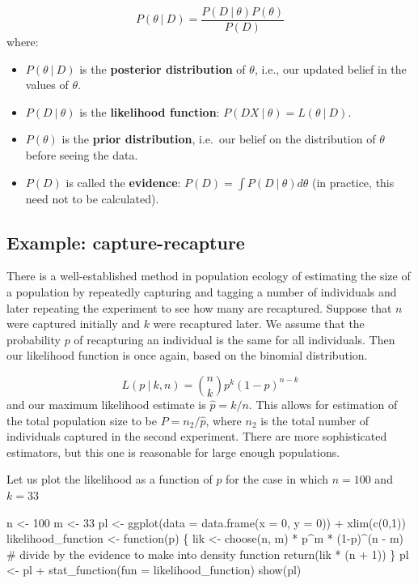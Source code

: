 \documentclass[
  letterpaper,
  DIV=11,
  numbers=noendperiod]{scrreprt}
\newenvironment{Shaded}{\begin{snugshade}}{\end{snugshade}}
\newcommand{\NormalTok}[1]{\textcolor[rgb]{0.00,0.23,0.31}{#1}}
\providecommand{\tightlist}{%
  \setlength{\itemsep}{0pt}\setlength{\parskip}{0pt}}\usepackage{longtable,booktabs,array}
\begin{document}
\[
P(\theta \ \vert \ D) = \frac{P(D \ \vert \ \theta) P(\theta)}{P(D)}
\] where:

\begin{itemize}
\tightlist
\item
  \(P(\theta \ \vert \ D)\) is the \textbf{posterior distribution} of
  \(\theta\), i.e., our updated belief in the values of \(\theta\).
\item
  \(P(D \ \vert \ \theta)\) is the \textbf{likelihood function}:
  \(P(DX \ \vert \ \theta) = L(\theta \ \vert \ D)\).
\item
  \(P(\theta)\) is the \textbf{prior distribution}, i.e.~our belief on
  the distribution of \(\theta\) before seeing the data.
\item
  \(P(D)\) is called the \textbf{evidence}:
  \(P(D) = \int P(D \ \vert \ \theta) d \theta\) (in practice, this need
  not to be calculated).
\end{itemize}

\subsection{Example: capture-recapture}\label{example-capture-recapture}

There is a well-established method in population ecology of estimating
the size of a population by repeatedly capturing and tagging a number of
individuals and later repeating the experiment to see how many are
recaptured. Suppose that \(n\) were captured initially and \(k\) were
recaptured later. We assume that the probability \(p\) of recapturing an
individual is the same for all individuals. Then our likelihood function
is once again, based on the binomial distribution.

\[
L(p \ \vert \ k, n) = \binom{n}{k}p^k (1-p)^{n-k}
\] and our maximum likelihood estimate is \(\hat{p} = k /n\). This
allows for estimation of the total population size to be
\(P = n_2/\hat p\), where \(n_2\) is the total number of individuals
captured in the second experiment. There are more sophisticated
estimators, but this one is reasonable for large enough populations.

Let us plot the likelihood as a function of \(p\) for the case in which
\(n = 100\) and \(k = 33\)

\begin{Shaded}
\begin{Highlighting}[]
\NormalTok{n \textless{}{-} 100}
\NormalTok{m \textless{}{-} 33}
\NormalTok{pl \textless{}{-} ggplot(data = data.frame(x = 0, y = 0)) + xlim(c(0,1))}
\NormalTok{likelihood\_function \textless{}{-} function(p) \{}
\NormalTok{  lik \textless{}{-} choose(n, m) * p\^{}m * (1{-}p)\^{}(n {-} m)}
\NormalTok{  \# divide by the evidence to make into density function}
\NormalTok{  return(lik * (n + 1))}
\NormalTok{\}}
\NormalTok{pl \textless{}{-} pl + stat\_function(fun = likelihood\_function)}
\NormalTok{show(pl)}
\end{Highlighting}
\end{Shaded}
\end{document}

